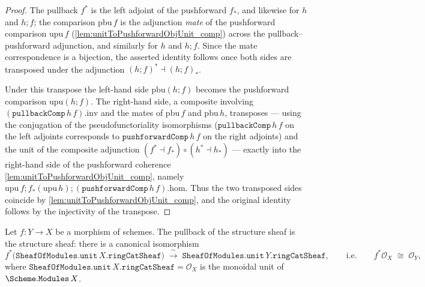 \begin{proof}
  \leanok
  The pullback \(f^*\) is the left adjoint of the pushforward \(f_*\), and likewise for
  \(h\) and \(h \mathbin{;} f\); the comparison \(\mathrm{pbu}\,f\) is the adjunction
  \emph{mate} of the pushforward comparison \(\mathrm{upu}\,f\)
  (\cref{lem:unitToPushforwardObjUnit_comp}) across the pullback--pushforward adjunction,
  and similarly for \(h\) and \(h \mathbin{;} f\). Since the mate correspondence is a
  bijection, the asserted identity follows once both sides are transposed under the
  adjunction \((h \mathbin{;} f)^* \dashv (h \mathbin{;} f)_*\).

  Under this transpose the left-hand side \(\mathrm{pbu}(h \mathbin{;} f)\) becomes the
  pushforward comparison \(\mathrm{upu}(h \mathbin{;} f)\). The right-hand side, a
  composite involving \((\mathtt{pullbackComp}\,h\,f).\mathrm{inv}\) and the mates of
  \(\mathrm{pbu}\,f\) and \(\mathrm{pbu}\,h\), transposes --- using the conjugation of the
  pseudofunctoriality isomorphisms (\(\mathtt{pullbackComp}\,h\,f\) on the left adjoints
  corresponds to \(\mathtt{pushforwardComp}\,h\,f\) on the right adjoints) and the unit of
  the composite adjunction \((f^* \dashv f_*) \circ (h^* \dashv h_*)\) --- exactly into the
  right-hand side of the pushforward coherence
  \cref{lem:unitToPushforwardObjUnit_comp}, namely
  \(\mathrm{upu}\,f \mathbin{;} f_*(\mathrm{upu}\,h) \mathbin{;}
  (\mathtt{pushforwardComp}\,h\,f).\mathrm{hom}\). Thus the two transposed sides coincide
  by \cref{lem:unitToPushforwardObjUnit_comp}, and the original identity follows by the
  injectivity of the transpose.
\end{proof}

\begin{lemma}\leanok
  \label{lem:pullback_unit_iso}
  Let \(f : Y \to X\) be a morphism of schemes. The pullback of the structure sheaf
  is the structure sheaf: there is a canonical isomorphism
  \[
    f^*\bigl(\mathtt{SheafOfModules.unit}\,X.\mathtt{ringCatSheaf}\bigr)
      \;\xrightarrow{\;\sim\;}\;
    \mathtt{SheafOfModules.unit}\,Y.\mathtt{ringCatSheaf},
    \qquad\text{i.e.}\qquad
    f^* \mathcal{O}_X \;\cong\; \mathcal{O}_Y,
  \]
  where \(\mathtt{SheafOfModules.unit}\,X.\mathtt{ringCatSheaf} = \mathcal{O}_X\) is
  the monoidal unit of \(\Scheme.\mathtt{Modules}\,X\).
\end{lemma}

